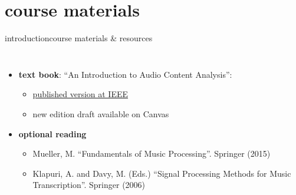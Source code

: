     \section[course materials]{course materials}
        \begin{frame}{introduction}{course materials \& resources}
            \vspace{-4mm}
            \begin{columns}[T]
                    \begin{itemize}
                        \item   \textbf{text book}: ``An Introduction to Audio Content Analysis'':
                        
                            
                            \begin{itemize}
                                \item   \href{https://ieeexplore.ieee.org/servlet/opac?bknumber=6266785}{published version at IEEE}
                                \item   new edition draft available on Canvas
                            \end{itemize}

                        \smallskip
                        \item<2->  \textbf{optional reading}
                            
                            \begin{itemize}
                                \item   \footnotesize Mueller, M. ``Fundamentals of Music Processing''. Springer (2015)
                                \item   \footnotesize Klapuri, A. and Davy, M. (Eds.) ``Signal Processing Methods for Music Transcription''. Springer (2006)
                            \end{itemize}
                            \normalsize


\end{itemize}
\end{columns}
\end{frame}
